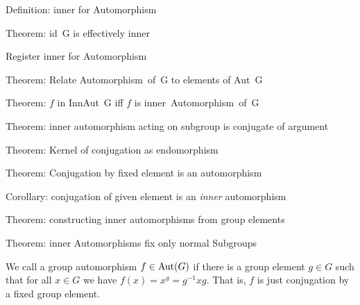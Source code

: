 \nwenddocs{}\endmoddef\nwstartdeflinemarkup{}\nwenddeflinemarkup
\LA{}Definition: \code{}inner\edoc{} for Automorphism~{\nwtagstyle{}}\RA{}

\LA{}Theorem: \code{}id\ G\edoc{} is effectively inner~{\nwtagstyle{}}\RA{}

\LA{}Register \code{}inner\edoc{} for \code{}Automorphism\edoc{}~{\nwtagstyle{}}\RA{}

\LA{}Theorem: Relate \code{}Automorphism\ of\ G\edoc{} to elements of \code{}Aut\ G\edoc{}~{\nwtagstyle{}}\RA{}

\LA{}Theorem: $f$ in \code{}InnAut\ G\edoc{} iff $f$ is \code{}inner\ Automorphism\ of\ G\edoc{}~{\nwtagstyle{}}\RA{}

\LA{}Theorem: inner automorphism acting on subgroup is conjugate of argument~{\nwtagstyle{}}\RA{}

\LA{}Theorem: Kernel of conjugation as endomorphism~{\nwtagstyle{}}\RA{}

\LA{}Theorem: Conjugation by fixed element is an automorphism~{\nwtagstyle{}}\RA{}

\LA{}Corollary: conjugation of given element is an \emph{inner} automorphism~{\nwtagstyle{}}\RA{}

\LA{}Theorem: constructing inner automorphisms from group elements~{\nwtagstyle{}}\RA{}

\LA{}Theorem: inner Automorphisms fix only normal Subgroups~{\nwtagstyle{}}\RA{}
\nwendcode{}\nwdocspar

\begin{definition}
We call a group automorphism $f\in\operatorname{Aut}(G)$  if there is a
group element $g\in G$ such that for all $x\in G$ we have $f(x) = x^{g} = g^{-1}xg$.
That is, $f$ is just conjugation by a fixed group element.
\end{definition}


